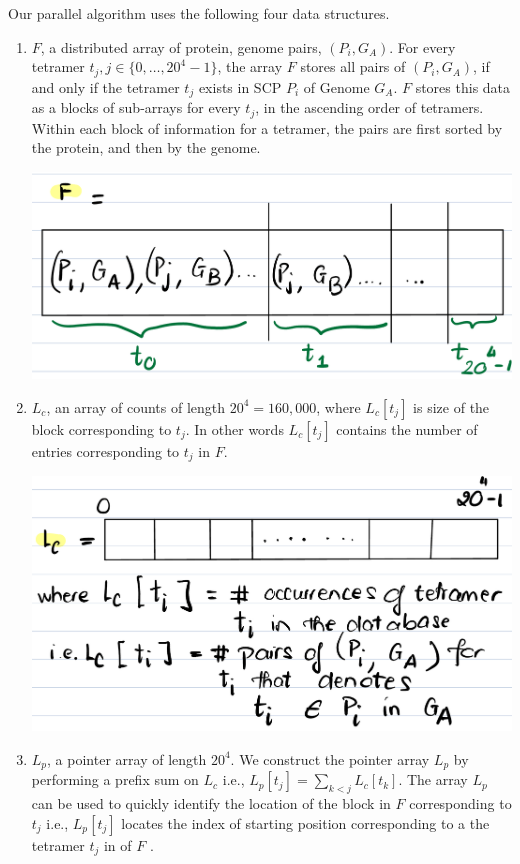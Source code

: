 \documentclass{article}[11pt]
\begin{document}
Our parallel algorithm uses the following four data structures. 
\begin{enumerate}
    \item $F$, a distributed array of protein, genome pairs, $(P_i, G_A)$. 
    For every tetramer $t_j, j\in\{0,\dots,20^4-1\}$, the array $F$ stores all pairs of $(P_i, G_A)$, if and only if the tetramer $t_j$ exists in SCP $P_i$ of Genome $G_A$. 
    $F$ stores this data as a blocks of sub-arrays for every $t_j$, in the ascending order of tetramers. 
    Within each block of information for a tetramer, the pairs are first sorted by the protein, and then by the genome. 
   
    \includegraphics[width=\textwidth]{figures/F_table_tetramer_indexed.jpeg}
    
    \item $L_c$, an array of counts of length $20^4 = 160,000$, where $L_c[t_j]$ is size of the block corresponding to $t_j$. 
    In other words $L_c[t_j]$ contains the number of entries corresponding to $t_j$ in $F$.  
    
    \includegraphics[width=\textwidth]{figures/Lc_table_tetramer_indexed.jpeg}

    \item $L_p$, a pointer array of length $20^4$.
    We construct the pointer array $L_p$ by performing a prefix sum on  $L_c$ i.e., $L_p[t_j] = \sum_{k < j} L_c[t_k]$.
    The array $L_p$ can be used to quickly identify the location of the block in $F$ corresponding to $t_j$ i.e., $L_p[t_j]$ locates the index of starting position corresponding to a the tetramer $t_j$ in of $F$ .
    

\end{enumerate}
\end{document}
